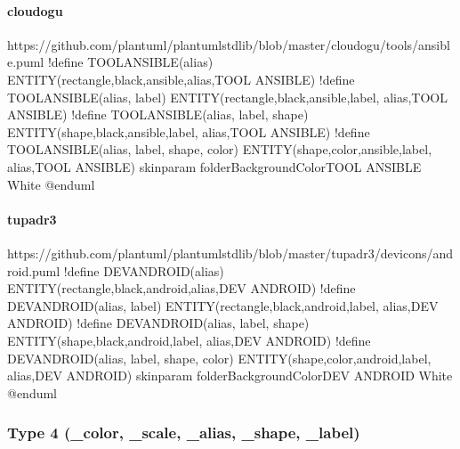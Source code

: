 \documentclass[letterpaper,10pt,english]{sphinxmanual}
\begin{document}
\paragraph{cloudogu}
\label{\detokenize{Stdlib/StdLibOverview:cloudogu}}
\begin{sphinxVerbatim}[commandchars=\\\{\}]
https://github.com/plantuml/plantuml\PYGZhy{}stdlib/blob/master/cloudogu/tools/ansible.puml
!define TOOL\PYGZus{}ANSIBLE(\PYGZus{}alias) ENTITY(rectangle,black,ansible,\PYGZus{}alias,TOOL ANSIBLE)
!define TOOL\PYGZus{}ANSIBLE(\PYGZus{}alias, \PYGZus{}label) ENTITY(rectangle,black,ansible,\PYGZus{}label, \PYGZus{}alias,TOOL ANSIBLE)
!define TOOL\PYGZus{}ANSIBLE(\PYGZus{}alias, \PYGZus{}label, \PYGZus{}shape) ENTITY(\PYGZus{}shape,black,ansible,\PYGZus{}label, \PYGZus{}alias,TOOL ANSIBLE)
!define TOOL\PYGZus{}ANSIBLE(\PYGZus{}alias, \PYGZus{}label, \PYGZus{}shape, \PYGZus{}color) ENTITY(\PYGZus{}shape,\PYGZus{}color,ansible,\PYGZus{}label, \PYGZus{}alias,TOOL ANSIBLE)
skinparam folderBackgroundColor\PYGZlt{}\PYGZlt{}TOOL ANSIBLE\PYGZgt{}\PYGZgt{} White
@enduml
\end{sphinxVerbatim}


\paragraph{tupadr3}
\label{\detokenize{Stdlib/StdLibOverview:tupadr3}}
\begin{sphinxVerbatim}[commandchars=\\\{\}]
https://github.com/plantuml/plantuml\PYGZhy{}stdlib/blob/master/tupadr3/devicons/android.puml
!define DEV\PYGZus{}ANDROID(\PYGZus{}alias) ENTITY(rectangle,black,android,\PYGZus{}alias,DEV ANDROID)
!define DEV\PYGZus{}ANDROID(\PYGZus{}alias, \PYGZus{}label) ENTITY(rectangle,black,android,\PYGZus{}label, \PYGZus{}alias,DEV ANDROID)
!define DEV\PYGZus{}ANDROID(\PYGZus{}alias, \PYGZus{}label, \PYGZus{}shape) ENTITY(\PYGZus{}shape,black,android,\PYGZus{}label, \PYGZus{}alias,DEV ANDROID)
!define DEV\PYGZus{}ANDROID(\PYGZus{}alias, \PYGZus{}label, \PYGZus{}shape, \PYGZus{}color) ENTITY(\PYGZus{}shape,\PYGZus{}color,android,\PYGZus{}label, \PYGZus{}alias,DEV ANDROID)
skinparam folderBackgroundColor\PYGZlt{}\PYGZlt{}DEV ANDROID\PYGZgt{}\PYGZgt{} White
@enduml
\end{sphinxVerbatim}


\subsubsection{Type 4 (\_color, \_scale, \_alias, \_shape, \_label)}
\label{\detokenize{Stdlib/StdLibOverview:type-4-color-scale-alias-shape-label}}
\end{document}
